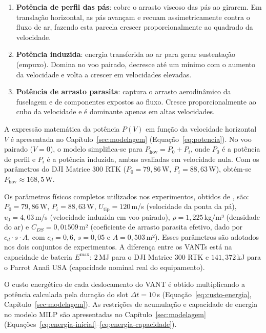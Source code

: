 \begin{enumerate}
    \item \textbf{Potência de perfil das pás}: cobre o arrasto viscoso das pás ao girarem. Em translação horizontal, as pás avançam e recuam assimetricamente contra o fluxo de ar, fazendo esta parcela crescer proporcionalmente ao quadrado da velocidade.
    \item \textbf{Potência induzida}: energia transferida ao ar para gerar sustentação (empuxo). Domina no voo pairado, decresce até um mínimo com o aumento da velocidade e volta a crescer em velocidades elevadas.
    \item \textbf{Potência de arrasto parasita}: captura o arrasto aerodinâmico da fuselagem e de componentes expostos ao fluxo. Cresce proporcionalmente ao cubo da velocidade e é dominante apenas em altas velocidades.
\end{enumerate}

A expressão matemática da potência $P(V)$ em função da velocidade horizontal $V$ é apresentada no Capítulo~\ref{sec:modelagem} (Equação~\eqref{eq:potencia}). No voo pairado ($V = 0$), o modelo simplifica-se para $P_{\mathrm{hov}} = P_0 + P_i$, onde $P_0$ é a potência de perfil e $P_i$ é a potência induzida, ambas avaliadas em velocidade nula. Com os parâmetros do DJI Matrice 300 RTK ($P_0 = 79{,}86$\,W, $P_i = 88{,}63$\,W), obtém-se $P_{\mathrm{hov}} \approx 168{,}5$\,W.

Os parâmetros físicos completos utilizados nos experimentos, obtidos de \cite{zeng2019rotarywing}, são: $P_0 = 79{,}86$\,W, $P_i = 88{,}63$\,W, $U_{\mathrm{tip}} = 120$\,m/s (velocidade da ponta da pá), $v_0 = 4{,}03$\,m/s (velocidade induzida em voo pairado), $\rho = 1{,}225$\,kg/m³ (densidade do ar) e $C_{DS} = 0{,}01509$\,m² (coeficiente de arrasto parasita efetivo, dado por $c_d \cdot s \cdot A$, com $c_d = 0{,}6$, $s = 0{,}05$ e $A = 0{,}503$\,m²). Esses parâmetros são adotados nos dois conjuntos de experimentos. A diferença entre os VANTs está na capacidade de bateria $E^{\max}$: $2$\,MJ para o DJI Matrice 300 RTK e $141{,}372$\,kJ para o Parrot Anafi USA (capacidade nominal real do equipamento).

O custo energético de cada deslocamento do VANT é obtido multiplicando a potência calculada pela duração do slot $\Delta t = 10$\,s (Equação~\eqref{eq:custo-energia}, Capítulo~\ref{sec:modelagem}). As restrições de acumulação e capacidade de energia no modelo MILP são apresentadas no Capítulo~\ref{sec:modelagem} (Equações~\eqref{eq:energia-inicial}--\eqref{eq:energia-capacidade}).


